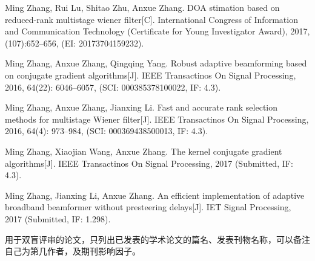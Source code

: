 
{}

\begin{publist}
	\item Ming Zhang, Rui Lu, Shitao Zhu, Anxue Zhang. DOA stimation based on reduced-rank multistage wiener filter[C]. International Congress of Information and Communication Technology (Certificate for Young Investigator Award), 2017, (107):652--656, (EI: 20173704159232).
	\item Ming Zhang, Anxue Zhang, Qingqing Yang. Robust adaptive beamforming based on conjugate gradient algorithms[J]. IEEE Transactinos On Signal Processing, 2016, 64(22): 6046--6057, (SCI: 000385378100022, IF: 4.3).
	\item Ming Zhang, Anxue Zhang, Jianxing Li. Fast and accurate rank selection methods for multistage Wiener filter[J]. IEEE Transactinos On Signal Processing, 2016, 64(4): 973--984, (SCI: 000369438500013, IF: 4.3).
	\item Ming Zhang, Xiaojian Wang, Anxue Zhang. The kernel conjugate gradient algorithms[J]. IEEE Transactinos On Signal Processing, 2017 (Submitted, IF: 4.3).
	\item Ming Zhang, Jianxing Li, Anxue Zhang. An efficient implementation of adaptive broadband beamformer without presteering delays[J]. IET Signal Processing, 2017 (Submitted, IF: 1.298).
\end{publist}

\vspace{4em}
{\color{red} 用于双盲评审的论文，只列出已发表的学术论文的篇名、发表刊物名称，可以备注自己为第几作者，及期刊影响因子。}

\clearpage{\pagestyle{empty}\cleardoublepage}%
